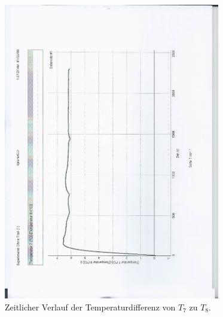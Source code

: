 \begin{figure}
  \centering
  \includegraphics[height=13cm, angle=90]{scan-5.jpg}
  \caption{Zeitlicher Verlauf der Temperaturdifferenz von $T_7$ zu $T_8$.}
  \label{fig:4}
\end{figure}


%    
%
